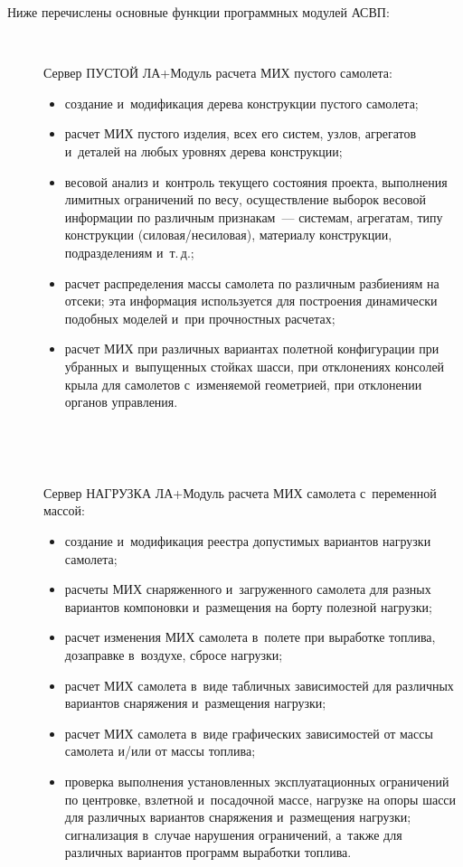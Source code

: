 \begin{multicols}{2}
  Ниже перечислены основные функции программных модулей АСВП:
 \begin{description}
 \item[\,] 
Сервер ПУСТОЙ ЛА\;+\;Модуль расчета МИХ пус\-то\-го самолета:
\begin{itemize}
\item создание и~модификация дерева конструкции пустого самолета;
\item расчет МИХ пустого изделия, всех его сис\-тем, узлов, агрегатов и~деталей 
на любых уровнях дерева конструкции;
\item весовой анализ и~контроль текущего состояния проекта, выполнения 
лимитных ограничений по весу, осуществление выборок весовой информации 
по различным признакам~--- сис\-те\-мам, агрегатам, типу конструкции 
(си\-ло\-вая/не\-си\-ло\-вая),  материалу конструкции, подразделениям и~т.\,д.;
\item расчет распределения массы самолета по различным разбиениям на 
отсеки; эта информация используется для построения динамически подобных 
моделей и~при прочностных расчетах;
\item расчет МИХ при различных вариантах полетной конфигурации при 
убранных и~выпущенных стойках шасси, при отклонениях консолей крыла для 
самолетов с~из\-ме\-ня\-емой геометрией, при отклонении органов управления.
\end{itemize}
\begin{figure*} %
\vspace*{1pt}
 \begin{center}
 \mbox{%
 \epsfxsize=155.86mm 
 }
 \end{center}
\vspace*{-1pt}
\vspace*{6pt}
\end{figure*}
 \item[\,]
Сервер НАГРУЗКА ЛА\;+\;Модуль расчета МИХ самолета с~переменной 
массой:
\begin{itemize}
\item создание и~модификация реестра допустимых вариантов нагрузки 
самолета;
\item расчеты МИХ снаряженного и~загруженного самолета для разных 
вариантов компоновки и~размещения на борту полезной нагрузки;
\item расчет изменения МИХ самолета в~полете при выработке топлива, 
дозаправке в~воздухе, сбросе нагрузки;
\item расчет МИХ самолета в~виде табличных зависимостей для различных 
вариантов снаряжения и~размещения нагрузки;
\item расчет МИХ самолета в~виде графических зависимостей от массы 
самолета и/или от массы топлива;
\item проверка выполнения установленных эксплуатационных ограничений по 
центровке, взлетной и~посадочной массе, нагрузке на опоры шасси для 
различных вариантов снаряжения и~размещения нагрузки; сигнализация 
в~случае нарушения ограничений, а~также для различных вариантов программ 
выработки топлива.
\end{itemize}


\end{description}
\end{multicols}
